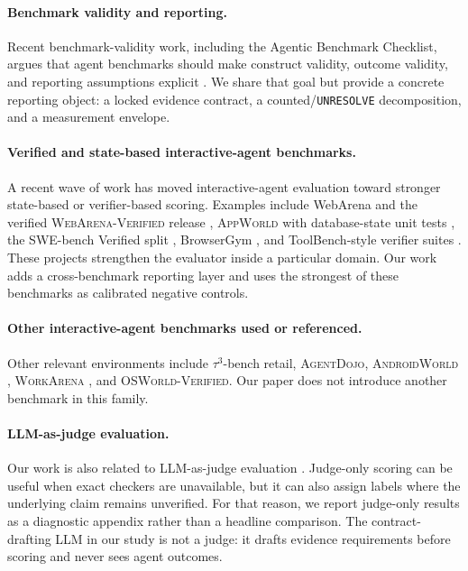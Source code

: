 \documentclass{article}
\newcommand{\agentdojo}{\textsc{AgentDojo}\xspace}
\newcommand{\appworld}{\textsc{AppWorld}\xspace}
\newcommand{\webarena}{\textsc{WebArena-Verified}\xspace}
\newcommand{\tauthree}{\(\tau^3\)-bench retail\xspace}
\newcommand{\androidworld}{\textsc{AndroidWorld}\xspace}
\newcommand{\workarena}{\textsc{WorkArena}\xspace}
\newcommand{\osworld}{\textsc{OSWorld-Verified}\xspace}
\begin{document}
\paragraph{Benchmark validity and reporting.}
Recent benchmark-validity work, including the Agentic Benchmark Checklist,
argues that agent benchmarks should make construct validity, outcome validity,
and reporting assumptions explicit \citep{kang2025agenticbenchmarks}. We share
that goal but provide a concrete reporting object: a locked evidence contract,
a counted/\texttt{UNRESOLVE} decomposition, and a measurement envelope.

\paragraph{Verified and state-based interactive-agent benchmarks.}
A recent wave of work has moved interactive-agent evaluation toward stronger
state-based or verifier-based scoring. Examples include WebArena and the
verified \webarena release \citep{zhou2023webarena, elhattami2025webarena},
\appworld with database-state unit tests \citep{appworld2024}, the SWE-bench
Verified split \citep{swebenchverified2024}, BrowserGym
\citep{lesellierdechezelles2024browsergym}, and ToolBench-style verifier suites
\citep{toolbench2024}. These projects strengthen the evaluator inside a
particular domain. Our work adds a cross-benchmark reporting layer and uses the
strongest of these benchmarks as calibrated negative controls.

\paragraph{Other interactive-agent benchmarks used or referenced.}
Other relevant environments include \tauthree \citep{barres2026tau3bench},
\agentdojo \citep{agentdojo}, \androidworld
\citep{rawles2025androidworlddynamicbenchmarkingenvironment}, \workarena
\citep{workarena2024}, and \osworld \citep{osworld2024}. Our paper does not
introduce another benchmark in this family.

\paragraph{LLM-as-judge evaluation.}
Our work is also related to LLM-as-judge evaluation \citep{zheng2023judging,
shi2024judgingjudges}. Judge-only scoring can be useful when exact checkers are
unavailable, but it can also assign labels where the underlying claim remains
unverified. For that reason, we report judge-only results as a diagnostic
appendix rather than a headline comparison. The contract-drafting LLM in our
study is not a judge: it drafts evidence requirements before scoring and never
sees agent outcomes.
\end{document}
